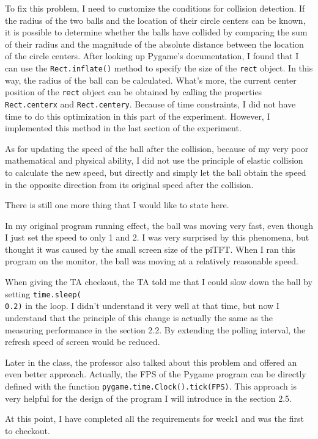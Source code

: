 \documentclass[12pt]{report}
\newcommand{\code}[1]{\colorbox{light-gray}{\texttt{#1}}}
\begin{document}
To fix this problem, I need to customize the conditions for collision detection. If the radius of the two balls and the location of their circle centers can be known, it is possible to determine whether the balls have collided by comparing the sum of their radius and the magnitude of the absolute distance between the location of the circle centers. After looking up Pygame's documentation, I found that I can use the \code{Rect.inflate()} method to specify the size of the \code{rect} object. In this way, the radius of the ball can be calculated. What's more, the current center position of the \code{rect} object can be obtained by calling the properties \code{Rect.centerx} and \code{Rect.centery}. Because of time constraints, I did not have time to do this optimization in this part of the experiment. However, I implemented this method in the last section of the experiment.\par
As for updating the speed of the ball after the collision, because of my very poor mathematical and physical ability, I did not use the principle of elastic collision to calculate the new speed, but directly and simply let the ball obtain the speed in the opposite direction from its original speed after the collision.\par
There is still one more thing that I would like to state here.\par
In my original program running effect, the ball was moving very fast, even though I just set the speed to only 1 and 2. I was very surprised by this phenomena, but thought it was caused by the small screen size of the piTFT. When I ran this program on the monitor, the ball was moving at a relatively reasonable speed. \par
When giving the TA checkout, the TA told me that I could slow down the ball by setting \code{time.sleep(}\\\code{0.2)} in the loop. I didn't understand it very well at that time, but now I understand that the principle of this change is actually the same as the measuring performance in the section 2.2. By extending the polling interval, the refresh speed of screen would be reduced.\par
Later in the class, the professor also talked about this problem and offered an even better approach. Actually, the FPS of the Pygame program can be directly defined with the function \code{pygame.time.Clock().tick(FPS)}. This approach is very helpful for the design of the program I will introduce in the section 2.5.\par
At this point, I have completed all the requirements for week1 and was the first to checkout.\vspace{-1em}
\end{document}
